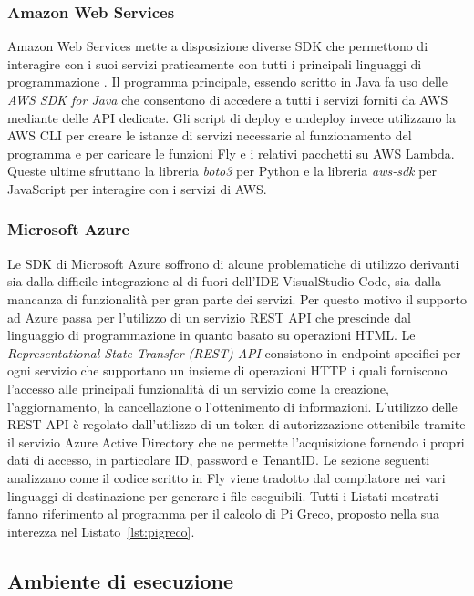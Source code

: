 \subsubsection{Amazon Web Services}
Amazon Web Services mette a disposizione diverse SDK che permettono di interagire con i suoi servizi praticamente con tutti i principali linguaggi di programmazione \cite{awsSDK}. Il programma principale, essendo scritto in Java fa uso delle \textit{AWS SDK for Java} \cite{AwsJavaSDK} che consentono di accedere a tutti i servizi forniti da AWS mediante delle API dedicate. Gli script di deploy e undeploy invece utilizzano la AWS CLI \cite{awsCLI} per creare le istanze di servizi necessarie al funzionamento del programma e per caricare le funzioni Fly e i relativi pacchetti su AWS Lambda. Queste ultime sfruttano la libreria \textit{boto3} per Python \cite{AwsPySDK} e la libreria \textit{aws-sdk} per JavaScript \cite{AwsJsSDK} per interagire con i servizi di AWS.

\subsubsection{Microsoft Azure}
Le SDK di Microsoft Azure soffrono di alcune problematiche di utilizzo derivanti sia dalla difficile integrazione al di fuori dell’IDE VisualStudio Code, sia dalla mancanza di funzionalità per gran parte dei servizi. Per questo motivo il supporto ad Azure passa per l’utilizzo di un servizio REST API che prescinde dal linguaggio di programmazione in quanto basato su operazioni HTML. Le \textit{Representational State Transfer (REST) API} consistono in endpoint specifici per ogni servizio che supportano un insieme di operazioni HTTP i quali forniscono l’accesso alle principali funzionalità di un servizio come la creazione, l’aggiornamento, la cancellazione o l’ottenimento di informazioni. L’utilizzo delle REST API è regolato dall’utilizzo di un token di autorizzazione ottenibile tramite il servizio Azure Active Directory che ne permette l’acquisizione fornendo i propri dati di accesso, in particolare ID, password e TenantID.
\newpage 
Le sezione seguenti analizzano come il codice scritto in Fly viene tradotto dal compilatore nei vari linguaggi di destinazione per generare i file eseguibili. Tutti i Listati mostrati fanno riferimento al programma  per il calcolo di Pi Greco, proposto nella sua interezza nel Listato~\ref{lst:pigreco}.

\subsection{Ambiente di esecuzione}

